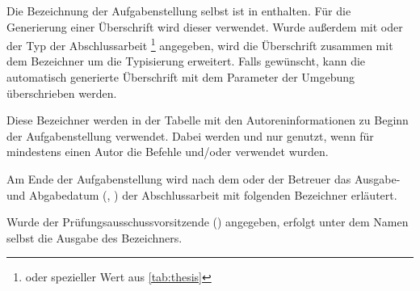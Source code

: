 \begin{Declaration*}{}
\begin{Declaration}{}
\begin{Declaration}{}
\printdeclarationlist%
%
Die Bezeichnung der Aufgabenstellung selbst ist in  enthalten. 
Für die Generierung einer Überschrift wird dieser verwendet. Wurde außerdem mit 
 oder  der Typ der Abschlussarbeit%
\footnote{%
   oder spezieller Wert aus \autoref{tab:thesis}
}
angegeben, wird die Überschrift zusammen mit dem Bezeichner 
um die Typisierung erweitert. Falls gewünscht, kann die automatisch generierte 
Überschrift mit dem Parameter  der Umgebung 
 überschrieben werden.
\end{Declaration}
\end{Declaration}

\begin{Declaration}[v2.04]{}
\begin{Declaration}{}
\begin{Declaration}{}
\begin{Declaration}[v2.02]{}
\printdeclarationlist%
%
Diese Bezeichner werden in der Tabelle mit den Autoreninformationen zu Beginn 
der Aufgabenstellung verwendet. Dabei werden  und 
 nur genutzt, wenn für mindestens einen Autor die Befehle 
 und/oder  verwendet wurden.
\end{Declaration}
\end{Declaration}
\end{Declaration}
\end{Declaration}

\begin{Declaration}{}
\begin{Declaration}{}
\printdeclarationlist%
%
Am Ende der Aufgabenstellung wird nach dem oder der Betreuer das Ausgabe- und 
Abgabedatum (, ) der Abschlussarbeit mit 
folgenden Bezeichner erläutert.
\end{Declaration}
\end{Declaration}

\begin{Declaration}{}
\printdeclarationlist%
%
Wurde der Prüfungsausschussvorsitzende () angegeben, erfolgt 
unter dem Namen selbst die Ausgabe des Bezeichners.
\end{Declaration}


\end{Declaration*}

